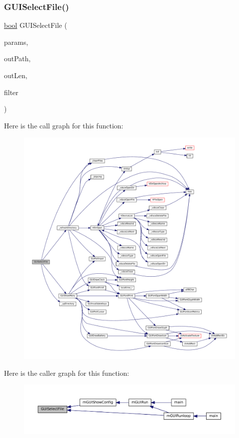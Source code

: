 \subsubsection{\texorpdfstring{G\+U\+I\+Select\+File()}{GUISelectFile()}}
{\footnotesize\ttfamily \mbox{\hyperlink{libretro_8h_a4a26dcae73fb7e1528214a068aca317e}{bool}} G\+U\+I\+Select\+File (\begin{DoxyParamCaption}\item[{struct G\+U\+I\+Params $\ast$}]{params,  }\item[{char $\ast$}]{out\+Path,  }\item[{size\+\_\+t}]{out\+Len,  }\item[{\mbox{\hyperlink{libretro_8h_a4a26dcae73fb7e1528214a068aca317e}{bool}}($\ast$)(struct V\+File $\ast$)}]{filter }\end{DoxyParamCaption})}

Here is the call graph for this function\+:
\nopagebreak
\begin{figure}[H]
\begin{center}
\leavevmode
\includegraphics[width=350pt]{file-select_8c_a8ad8aec85f35dc0c7d53e825447c3fcb_cgraph}
\end{center}
\end{figure}
Here is the caller graph for this function\+:
\nopagebreak
\begin{figure}[H]
\begin{center}
\leavevmode
\includegraphics[width=350pt]{file-select_8c_a8ad8aec85f35dc0c7d53e825447c3fcb_icgraph}
\end{center}
\end{figure}
